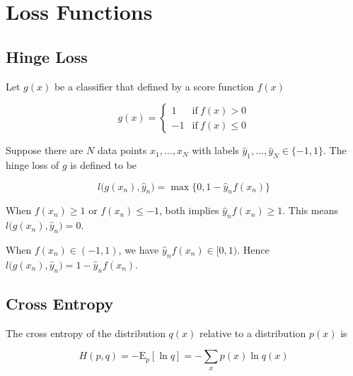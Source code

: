\documentclass{article}
\begin{document}
    \section{Loss Functions}

        \subsection{Hinge Loss}

            Let $ g(x) $ be a classifier that defined by a score function $ f(x) $

            \begin{equation*}
                g(x) = \left\{ 
                         \begin{array}{rl}
                            1 & \mathrm{if~} f(x) > 0\\
                            -1 & \mathrm{if~} f(x) \leq 0
                         \end{array}
                       \right.
            \end{equation*}

            Suppose there are $ N $ data points $ x_1, \dots, x_N $ with labels
            $ \hat{y}_1,\dots,\hat{y}_N \in \{ -1, 1 \} $. The hinge loss of $ g $
            is defined to be

            \begin{equation*}
                l\big( g(x_n),\hat{y}_n \big) = \max\{ 0, 1 - \hat{y}_n f(x_n) \}
            \end{equation*}

            When $ f(x_n) \geq 1 $ or $ f(x_n) \leq -1 $, both implies $ \hat{y}_n
            f(x_n) \geq 1 $. This means $ l\big( g(x_n), \hat{y}_n \big) = 0 $.

            When $ f(x_n) \in (-1, 1) $, we have $ \hat{y}_n f(x_n)\in [0, 1) $.
            Hence $ l\big( g(x_n), \hat{y}_n \big) = 1 - \hat{y}_n f(x_n) $.

        \subsection{Cross Entropy}

            The cross entropy of the distribution $ q(x) $ relative to a
            distribution $ p(x) $ is

            \begin{equation*}
                H(p,q) = -\mathrm{E}_p[\ln q] = - \sum_x p(x) \ln q(x) 
            \end{equation*}
\end{document}
